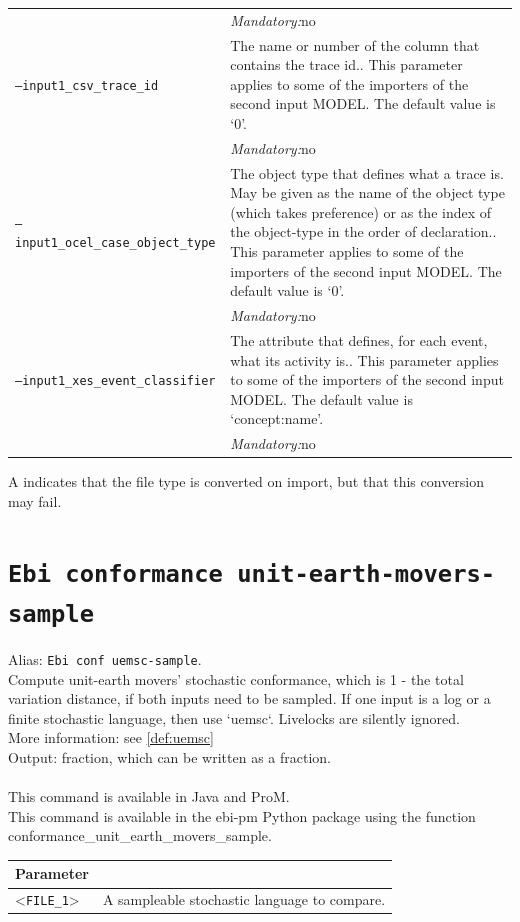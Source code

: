 {\begin{tabularx}{\linewidth}{lX}
&\textit{Mandatory:}\quad no\\
\texttt{--input1\_csv\_trace\_id} & The name or number of the column that contains the trace id.. This parameter applies to some of the importers of the second input MODEL. The default value is `0'.\\
&\textit{Mandatory:}\quad no\\
\texttt{--input1\_ocel\_case\_object\_type} & The object type that defines what a trace is. May be given as the name of the object type (which takes preference) or as the index of the object-type in the order of declaration.. This parameter applies to some of the importers of the second input MODEL. The default value is `0'.\\
&\textit{Mandatory:}\quad no\\
\texttt{--input1\_xes\_event\_classifier} & The attribute that defines, for each event, what its activity is.. This parameter applies to some of the importers of the second input MODEL. The default value is `concept:name'.\\
&\textit{Mandatory:}\quad no\\
\bottomrule
\end{tabularx}
A \textdagger{} indicates that the file type is converted on import, but that this conversion may fail.
\clearpage\section{\texttt{Ebi conformance unit-earth-movers-sample}}
\label{command:Ebi conformance unit-earth-movers-sample}
Alias: \texttt{Ebi conf uemsc-sample}.\\
Compute unit-earth movers' stochastic conformance, which is 1 - the total variation distance, if both inputs need to be sampled. 
        If one input is a log or a finite stochastic language, then use `uemsc`.
        Livelocks are silently ignored.\\
More information: see \cref{def:uemsc}~\\
\noindent Output: fraction, which can be written as a fraction.\\
\\This command is available in Java and ProM.
\\This command is available in the ebi-pm Python package using the function conformance\_unit\_earth\_movers\_sample.
\begin{tabularx}{\linewidth}{lX}
\toprule
Parameter \\\midrule
<\texttt{FILE\_1}>&A sampleable stochastic language to compare.\\

\end{tabularx}}
